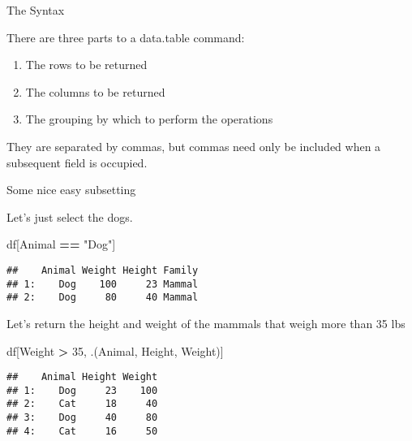 \documentclass[ignorenonframetext,]{beamer}
\newenvironment{Shaded}{\begin{snugshade}}{\end{snugshade}}
\newcommand{\DecValTok}[1]{\textcolor[rgb]{0.00,0.00,0.81}{#1}}
\newcommand{\NormalTok}[1]{#1}
\newcommand{\OperatorTok}[1]{\textcolor[rgb]{0.81,0.36,0.00}{\textbf{#1}}}
\newcommand{\StringTok}[1]{\textcolor[rgb]{0.31,0.60,0.02}{#1}}
\providecommand{\tightlist}{%
  \setlength{\itemsep}{0pt}\setlength{\parskip}{0pt}}
\begin{document}
\begin{frame}{The Syntax}
\protect\hypertarget{the-syntax}{}

There are three parts to a data.table command:

\begin{enumerate}
\tightlist
\item
  The rows to be returned
\item
  The columns to be returned
\item
  The grouping by which to perform the operations
\end{enumerate}

They are separated by commas, but commas need only be included when a
subsequent field is occupied.

\end{frame}

\begin{frame}[fragile]{Some nice easy subsetting}
\protect\hypertarget{some-nice-easy-subsetting}{}

Let's just select the dogs.

\begin{Shaded}
\begin{Highlighting}[]
\NormalTok{df[Animal }\OperatorTok{==}\StringTok{ "Dog"}\NormalTok{]}
\end{Highlighting}
\end{Shaded}

\begin{verbatim}
##    Animal Weight Height Family
## 1:    Dog    100     23 Mammal
## 2:    Dog     80     40 Mammal
\end{verbatim}

Let's return the height and weight of the mammals that weigh more than
35 lbs

\begin{Shaded}
\begin{Highlighting}[]
\NormalTok{df[Weight }\OperatorTok{>}\StringTok{ }\DecValTok{35}\NormalTok{, .(Animal, Height, Weight)]}
\end{Highlighting}
\end{Shaded}

\begin{verbatim}
##    Animal Height Weight
## 1:    Dog     23    100
## 2:    Cat     18     40
## 3:    Dog     40     80
## 4:    Cat     16     50
\end{verbatim}

\end{frame}
\end{document}
